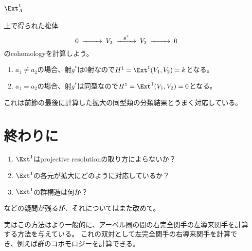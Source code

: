 \documentclass{jsarticle}
\begin{document}
\subsection{$\Ext^1_A$}
上で得られた複体
\[
\begin{CD}
0 @>>> V_2 @>g^*>> V_2 @>>> 0\\
\end{CD}
\]
のcohomologyを計算しよう。
\begin{enumerate}
\item $a_1\neq a_2$の場合、射$g^*$は$0$射なので$H^1=\Ext^1(V_1, V_2)=k$となる。
\item $a_1=a_2$の場合、射$g^*$は同型なので$H^1=\Ext^1(V_1, V_2)=0$となる。
\end{enumerate}

これは前節の最後に計算した拡大の同型類の分類結果とうまく対応している。

\section{終わりに}
\begin{enumerate}
\item $\Ext^1$はprojective resolutionの取り方によらないか？
\item $\Ext^1$の各元が拡大にどのように対応しているか？
\item $\Ext^1$の群構造は何か？
\end{enumerate}
などの疑問が残るが、それについてはまた改めて。

実はこの方法はより一般的に、アーベル圏の間の右完全関手の左導来関手を計算する方法を与えている。
これの双対として左完全関手の右導来関手を計算でき、例えば群のコホモロジーを計算できる。
\end{document}
